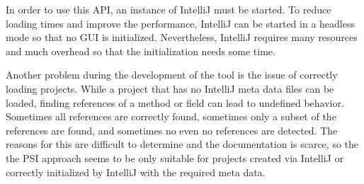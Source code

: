 In order to use this API, an instance of IntelliJ must be started. To reduce loading times and improve the performance, IntelliJ can be started in a headless mode so that no GUI is initialized. Nevertheless, IntelliJ requires many resources and much overhead so that  the initialization  needs some time.

Another problem during the development of the tool is the issue of correctly loading projects. While a project that has no IntelliJ meta data files can be loaded, finding references of a method or field can lead to undefined behavior. Sometimes all references are correctly found, sometimes only a subset of the references are found, and sometimes no even no references are detected. The reasons for this are difficult to determine and the documentation is scarce, so the the PSI approach seems to be only suitable for projects created via IntelliJ or correctly initialized by IntelliJ with the required meta data. 

